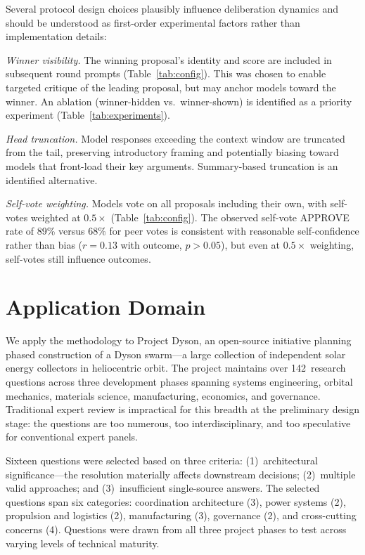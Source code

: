 \documentclass[11pt,a4paper]{article}
\begin{document}
Several protocol design choices plausibly influence deliberation dynamics and should be understood as first-order experimental factors rather than implementation details:

\textit{Winner visibility.} The winning proposal's identity and score are included in subsequent round prompts (Table~\ref{tab:config}). This was chosen to enable targeted critique of the leading proposal, but may anchor models toward the winner. An ablation (winner-hidden vs.\ winner-shown) is identified as a priority experiment (Table~\ref{tab:experiments}).

\textit{Head truncation.} Model responses exceeding the context window are truncated from the tail, preserving introductory framing and potentially biasing toward models that front-load their key arguments. Summary-based truncation is an identified alternative.

\textit{Self-vote weighting.} Models vote on all proposals including their own, with self-votes weighted at $0.5\times$ (Table~\ref{tab:config}). The observed self-vote APPROVE rate of 89\% versus 68\% for peer votes is consistent with reasonable self-confidence rather than bias ($r = 0.13$ with outcome, $p > 0.05$), but even at $0.5\times$ weighting, self-votes still influence outcomes.

\section{Application Domain}
\label{sec:domain}

We apply the methodology to Project Dyson, an open-source initiative planning phased construction of a Dyson swarm---a large collection of independent solar energy collectors in heliocentric orbit. The project maintains over 142~research questions across three development phases spanning systems engineering, orbital mechanics, materials science, manufacturing, economics, and governance. Traditional expert review is impractical for this breadth at the preliminary design stage: the questions are too numerous, too interdisciplinary, and too speculative for conventional expert panels.

Sixteen questions were selected based on three criteria: (1)~architectural significance---the resolution materially affects downstream decisions; (2)~multiple valid approaches; and (3)~insufficient single-source answers. The selected questions span six categories: coordination architecture (3), power systems (2), propulsion and logistics (2), manufacturing (3), governance (2), and cross-cutting concerns (4). Questions were drawn from all three project phases to test across varying levels of technical maturity.
\end{document}
